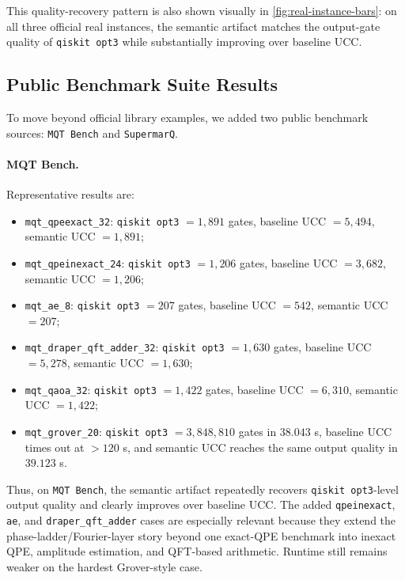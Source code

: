\documentclass[11pt]{article}
\begin{document}
This quality-recovery pattern is also shown visually in
\cref{fig:real-instance-bars}: on all three official real instances, the
semantic artifact matches the output-gate quality of \texttt{qiskit opt3} while
substantially improving over baseline UCC.

\subsection{Public Benchmark Suite Results}

To move beyond official library examples, we added two public benchmark sources: \texttt{MQT Bench} and \texttt{SupermarQ}.

\paragraph{MQT Bench.}
Representative results are:
\begin{itemize}[leftmargin=1.5em]
    \item \texttt{mqt\_qpeexact\_32}: \texttt{qiskit opt3} $= 1{,}891$ gates, baseline UCC $= 5{,}494$, semantic UCC $= 1{,}891$;
    \item \texttt{mqt\_qpeinexact\_24}: \texttt{qiskit opt3} $= 1{,}206$ gates, baseline UCC $= 3{,}682$, semantic UCC $= 1{,}206$;
    \item \texttt{mqt\_ae\_8}: \texttt{qiskit opt3} $= 207$ gates, baseline UCC $= 542$, semantic UCC $= 207$;
    \item \texttt{mqt\_draper\_qft\_adder\_32}: \texttt{qiskit opt3} $= 1{,}630$ gates, baseline UCC $= 5{,}278$, semantic UCC $= 1{,}630$;
    \item \texttt{mqt\_qaoa\_32}: \texttt{qiskit opt3} $= 1{,}422$ gates, baseline UCC $= 6{,}310$, semantic UCC $= 1{,}422$;
    \item \texttt{mqt\_grover\_20}: \texttt{qiskit opt3} $= 3{,}848{,}810$ gates in $38.043$ s, baseline UCC times out at $>120$ s, and semantic UCC reaches the same output quality in $39.123$ s.
\end{itemize}
Thus, on \texttt{MQT Bench}, the semantic artifact repeatedly recovers
\texttt{qiskit opt3}-level output quality and clearly improves over baseline
UCC. The added \texttt{qpeinexact}, \texttt{ae}, and
\texttt{draper\_qft\_adder} cases are especially relevant because they extend
the phase-ladder/Fourier-layer story beyond one exact-QPE benchmark into
inexact QPE, amplitude estimation, and QFT-based arithmetic. Runtime still
remains weaker on the hardest Grover-style case.
\end{document}
